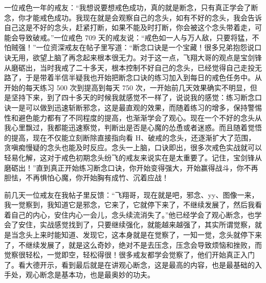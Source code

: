 \begin{case}
    一位戒色一年的戒友：“我想说要想戒色成功，真的就是断念，只有真正学会了断念，你才能戒色成功。我现在就是会观察自己的念头，如有不好的念头，我会告诉自己这是不好的念头，赶紧打断，如果不能及时打断，你会被这个念头带着走，可能会导致破戒。”一位戒色 709 天的戒友说：“戒色如一人与万人敌，只要将猛，不怕贼强！”一位资深戒友在帖子里写道：“断念口诀是一个宝藏！很多兄弟抱怨说口诀无用，欲望上脑了再念起来根本很无力。对于这一点，飞翔大哥的观点是宝剑锋从磨砺出，当时我戒了二十多天，根本控制不好自己的念头，已经觉得自己走投无路了，于是带着半信半疑我也开始把断念口诀的练习加入到每日的戒色任务中。从开始的每天练习 500 次到提高到每天 750 次，一开始前几天效果确实不明显，但是坚持下来，到了四十多天的时候我就感觉不一样了，说说我的感觉：练习断念口诀一是可以做到迅速斩断邪念，这是最直观的效果，而随着练习的增多，保持警惕性和避色能力都有了不同程度的提高，也渐渐学会了观心。现在一个不好的念头从我心里飘过，我都能迅速察觉，判断出是否是心魔的怂恿或者迷惑。而且随着觉悟的提高，现在不仅能立刻断除直接指向看 H、破戒的念头，还逐渐扩大了范围，贪嗔痴慢疑的念头也能及时反应。念头一上脑，口诀即出，很多次戒色实战就可以轻易化解，这对于戒色初期念头纷飞的戒友来说实在是太重要了。记住，宝剑锋从磨砺出！”直到真正开始练习断念口诀，你开始变得强大，开始赢得战斗，你不再胆怯，不再惧怕心魔，你开始胸有成竹、沉着应战！

    前几天一位戒友在我帖子里反馈：“飞翔哥，现在就是吧，邪念、yy、图像一来，我一觉察到，我知道它是邪念，它来了，它就停下来了，不继续发展了，然后我看着自己的内心，安住内心一会儿，念头续流消失了。”他已经学会了观心断念，也学会了安住，实战感觉找到了，只要继续强化，就能越来越强了，其实所谓觉察，就是当念头上来时能知道、发现它，这本身就是在觉察了，一知一觉，念头就停下来了，不继续发展了，就是这么奇妙，绝对不是去压念，压念会导致烦恼和挫败，而觉察很轻松，一觉即空，轻松得很！很多戒友都学会觉察了，他们开始真正入门了。看大德开示，看到最后就是在讲观心断念，这是最高的内容，也是最基础的入手处，观心断念是基本功，也是最奥妙的功夫。
\end{case}


